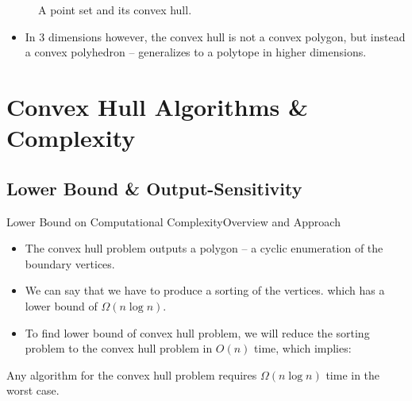 \documentclass{beamer}
\begin{document}
\begin{frame}[t]
\begin{figure}
\begin{subfigure}{0.35\textwidth}
      \end{subfigure}
      \caption{A point set and its convex hull.}
    \end{figure}
    \begin{itemize}
    \item In 3 dimensions however, the convex hull is not a convex polygon, but instead a 
    convex polyhedron -- generalizes to a polytope in higher dimensions.
  \end{itemize}
\end{frame}


    
    \section{Convex Hull Algorithms \& Complexity}
    \subsection{Lower Bound \& Output-Sensitivity}
    \begin{frame}[t]{Lower Bound on Computational Complexity}{Overview and Approach}
    \begin{itemize}
        \item The convex hull problem outputs a polygon -- a cyclic enumeration of the boundary vertices.
        \item We can say that we have to produce a sorting of the vertices.
        which has a lower bound of $\Omega(n\log n)$.
        \item To find lower bound of convex hull problem, we will reduce the sorting problem to the 
        convex hull problem in $O(n)$ time, which implies:
    \end{itemize}  
    \begin{theorem}
    Any algorithm for the convex hull problem requires $\Omega(n\log n)$ time in the worst case.
    \end{theorem}
    \end{frame}
    
\end{document}
